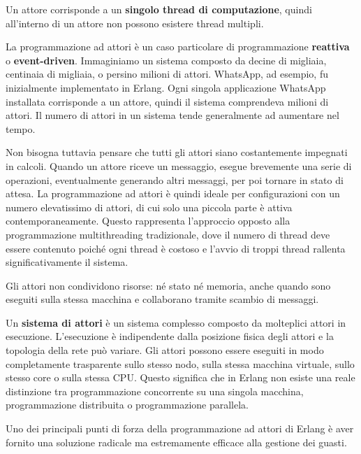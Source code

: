 \documentclass{article}
\begin{document}
Un attore corrisponde a un \textbf{singolo thread di computazione}, quindi all'interno di un attore non possono esistere thread multipli.

La programmazione ad attori è un caso particolare di programmazione \textbf{reattiva} o \textbf{event-driven}. Immaginiamo un sistema composto da decine di migliaia, centinaia di migliaia, o persino milioni di attori. WhatsApp, ad esempio, fu inizialmente implementato in Erlang. Ogni singola applicazione WhatsApp installata corrisponde a un attore, quindi il sistema comprendeva milioni di attori. Il numero di attori in un sistema tende generalmente ad aumentare nel tempo.

Non bisogna tuttavia pensare che tutti gli attori siano costantemente impegnati in calcoli. Quando un attore riceve un messaggio, esegue brevemente una serie di operazioni, eventualmente generando altri messaggi, per poi tornare in stato di attesa. La programmazione ad attori è quindi ideale per configurazioni con un numero elevatissimo di attori, di cui solo una piccola parte è attiva contemporaneamente. Questo rappresenta l'approccio opposto alla programmazione multithreading tradizionale, dove il numero di thread deve essere contenuto poiché ogni thread è costoso e l'avvio di troppi thread rallenta significativamente il sistema.

Gli attori non condividono risorse: né stato né memoria, anche quando sono eseguiti sulla stessa macchina e collaborano tramite scambio di messaggi.

Un \textbf{sistema di attori} è un sistema complesso composto da molteplici attori in esecuzione. L'esecuzione è indipendente dalla posizione fisica degli attori e la topologia della rete può variare. Gli attori possono essere eseguiti in modo completamente trasparente sullo stesso nodo, sulla stessa macchina virtuale, sullo stesso core o sulla stessa CPU. Questo significa che in Erlang non esiste una reale distinzione tra programmazione concorrente su una singola macchina, programmazione distribuita o programmazione parallela.

Uno dei principali punti di forza della programmazione ad attori di Erlang è aver fornito una soluzione radicale ma estremamente efficace alla gestione dei guasti.
\end{document}
